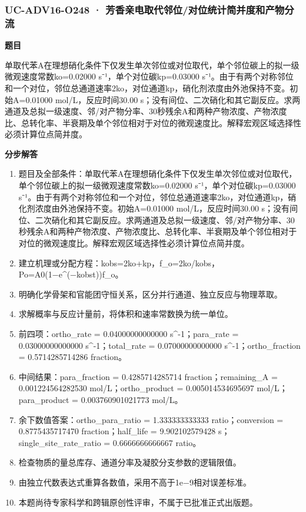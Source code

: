 \documentclass[UTF8,11pt,a4paper]{ctexart}
\begin{document}
\subsubsection*{UC-ADV16-O248 · 芳香亲电取代邻位/对位统计简并度和产物分流}
\noindent\textbf{题目}\par
单取代苯A在理想硝化条件下仅发生单次邻位或对位取代，单个邻位碳上的拟一级微观速度常数ko=0.02000 s⁻¹，单个对位碳kp=0.03000 s⁻¹。由于有两个对称邻位和一个对位，邻位总通道速率2ko，对位通道kp，硝化剂浓度由外池保持不变。初始A=0.01000 mol/L，反应时间30.00 s；没有间位、二次硝化和其它副反应。求两通道及总拟一级速度、邻/对产物分率、30秒残余A和两种产物浓度、产物浓度比、总转化率、半衰期及单个邻位相对于对位的微观速度比。解释宏观区域选择性必须计算位点简并度。\par
\medskip\noindent\textbf{分步解答}
\begin{enumerate}
\item 题目及全部条件：单取代苯A在理想硝化条件下仅发生单次邻位或对位取代，单个邻位碳上的拟一级微观速度常数ko=0.02000 s⁻¹，单个对位碳kp=0.03000 s⁻¹。由于有两个对称邻位和一个对位，邻位总通道速率2ko，对位通道kp，硝化剂浓度由外池保持不变。初始A=0.01000 mol/L，反应时间30.00 s；没有间位、二次硝化和其它副反应。求两通道及总拟一级速度、邻/对产物分率、30秒残余A和两种产物浓度、产物浓度比、总转化率、半衰期及单个邻位相对于对位的微观速度比。解释宏观区域选择性必须计算位点简并度。
\item 建立机理或分配方程：kobs=2ko+kp，f\_o=2ko/kobs，Po=A0(1−e\textasciicircum{}(−kobst))f\_o。
\item 明确化学骨架和官能团守恒关系，区分并行通道、独立反应与物理萃取。
\item 求解概率与反应计量前，将体积和速率常数换为统一单位。
\item 前四项：ortho\_rate = 0.04000000000000 s\textasciicircum{}-1；para\_rate = 0.03000000000000 s\textasciicircum{}-1；total\_rate = 0.07000000000000 s\textasciicircum{}-1；ortho\_fraction = 0.5714285714286 fraction。
\item 中间结果：para\_fraction = 0.4285714285714 fraction；remaining\_A = 0.001224564282530 mol/L；ortho\_product = 0.005014534695697 mol/L；para\_product = 0.003760901021773 mol/L。
\item 余下数值答案：ortho\_para\_ratio = 1.333333333333 ratio；conversion = 0.8775435717470 fraction；half\_life = 9.902102579428 s；single\_site\_rate\_ratio = 0.6666666666667 ratio。
\item 检查物质的量总库存、通道分率及凝胶分支参数的逻辑限值。
\item 由独立代数表达式重算各数值，采用不高于1e−9相对误差标准。
\item 本题尚待专家科学和跨辑原创性评审，不属于已批准正式出版题。
\end{enumerate}
\end{document}
